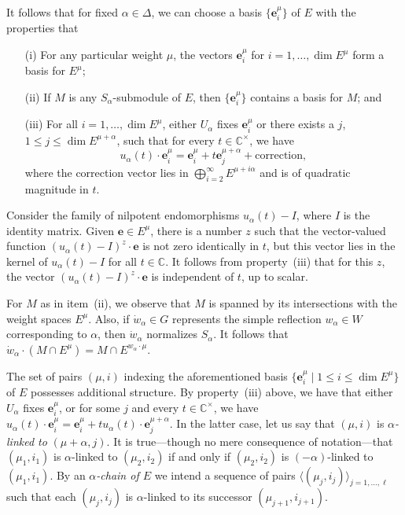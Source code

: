 \documentclass{amsart}
\theoremstyle{plain}
\theoremstyle{definition}
\theoremstyle{remark}
\newcommand{\Vect}[1]{\mathbold{#1}}
\begin{document}
It follows that for fixed $\alpha \in \Delta$, we can choose a basis $\{\Vect{e}^{\mu}_{i}\}$
of $E$ with the properties that
\begin{itemize}
\item[(i)] For any particular weight $\mu$, the vectors $\Vect{e}^{\mu}_{i}$ for $i = 1, \ldots, \dim E^{\mu}$
form a basis for $E^{\mu}$;
\item[(ii)] If $M$ is any $S_{\alpha}$-submodule of $E$, then $\{\Vect{e}^{\mu}_{i}\}$
contains a basis for $M$; and
\item[(iii)] For all $i = 1, \ldots, \dim E^{\mu}$, either $U_{\alpha}$ fixes
$\Vect{e}^{\mu}_{i}$ or there
exists a $j$, $1 \leqslant j \leqslant \dim E^{\mu + \alpha}$, such that for every $t \in
\mathbb{C}^{\times}$, we have
$$u_{\alpha}(t) \cdot \Vect{e}^{\mu}_{i} = \Vect{e}^{\mu}_{i} + t \Vect{e}^{\mu +
\alpha}_{j} + \text{correction},$$ where the correction vector lies in
$\bigoplus_{i = 2}^{\infty} E^{\mu + i\alpha}$ and is of quadratic magnitude in $t$.
\end{itemize}

Consider the family of nilpotent endomorphisms $u_{\alpha}(t) - I$, where $I$ is the
identity matrix. Given $\Vect{e} \in E^{\mu}$, there is a number $z$ such that the vector-valued
function $(u_{\alpha}(t) - I)^{z} \cdot \Vect{e}$ is not zero identically in $t$, but
this vector lies in the kernel of $u_{\alpha}(t) - I$ for all $t \in \mathbb{C}$. It follows from property~(iii) that
for this $z$,
the vector $(u_{\alpha}(t) - I)^{z} \cdot \Vect{e}$ is
independent of $t$, up to scalar.

For $M$ as in item~(ii), we observe that $M$ is spanned by its intersections
with the weight spaces $E^{\mu}$. Also, if $\dot{w}_{\alpha} \in G$ represents
the simple reflection $w_{\alpha}
\in W$ corresponding to $\alpha$, then $\dot{w}_{\alpha}$ normalizes $S_{\alpha}$. It
follows that $\dot{w}_{\alpha} \cdot (M \cap E^{\mu}) = M
\cap E^{w_{\alpha} \cdot \mu}$.

The set of pairs $(\mu, i)$ indexing the aforementioned basis
$\{ \Vect{e}^{\mu}_{i} \mid 1 \leqslant i \leqslant \dim E^{\mu}\}$ of $E$
possesses additional structure.
By property~(iii) above, we have that either $U_{\alpha}$ fixes
$\Vect{e}^{\mu}_{i}$, or for some $j$ and every $t \in
\mathbb{C}^{\times}$, we have
$u_{\alpha}(t) \cdot \Vect{e}^{\mu}_{i} = \Vect{e}^{\mu}_{i} + tu_{\alpha}(t) \cdot \Vect{e}^{\mu +
\alpha}_{j}$.
In the latter case, let us say that $(\mu, i)$ is \emph{$\alpha$-linked to} $(\mu + \alpha,
j)$. It is true---though no mere consequence of notation---that $(\mu_{1}, i_{1})$ is
$\alpha$-linked to $(\mu_{2}, i_{2})$ if and only if $(\mu_{2}, i_{2})$ is
$(-\alpha)$-linked to $(\mu_{1}, i_{1})$. By an \emph{$\alpha$-chain of $E$} we intend a
sequence of
pairs $\langle(\mu_{j}, i_{j})\rangle_{j = 1, \ldots, \ell}$ such that each
$(\mu_{j}, i_{j})$ is $\alpha$-linked to its successor $(\mu_{j + 1}, i_{j + 1})$.
\end{document}
